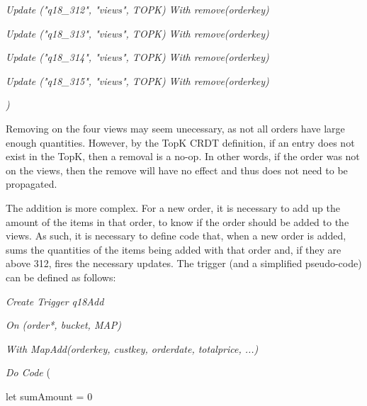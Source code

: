 \documentclass{vldb}
\newcommand{\grumbler}[2]{{\color{red}{\bf #1:} #2}}
\renewcommand{\grumbler}[2]{}
\newcommand{\andre}[1]{\grumbler{andre}{#1}}
\newcommand{\emphvspace}{0.5\baselineskip}
\newcommand{\firstblockemph}[1]{\vspace{\emphvspace}\hspace{2em}\emph{#1}}
\newcommand{\middleblockemph}[1]{\hspace{2em}\emph{#1}}
\newcommand{\lastblockemph}[1]{\hspace{2em}\emph{#1}\vspace{\emphvspace}}
\begin{document}
\middleblockemph{\hspace{-0.5em}	Update ("q18\_312", "views", TOPK) With remove(orderkey)}

\middleblockemph{\hspace{-0.5em}	Update ("q18\_313", "views", TOPK) With remove(orderkey)}

\middleblockemph{\hspace{-0.5em}	Update ("q18\_314", "views", TOPK) With remove(orderkey)}

\middleblockemph{\hspace{-0.5em}	Update ("q18\_315", "views", TOPK) With remove(orderkey)}

\lastblockemph{\hspace{-1.2em})}

Removing on the four views may seem unecessary, as not all orders have large enough quantities.
However, by the TopK CRDT definition, if an entry does not exist in the TopK, then a removal is a no-op.
In other words, if the order was not on the views, then the remove will have no effect and thus does not need to be propagated.

\andre{In relation to what's above, another possible solution would be to add an extra field to orders to know the amount of items ordered and thus know which TopKs to remove from. The current implementation of the clients keeps this information.}

The addition is more complex.
For a new order, it is necessary to add up the amount of the items in that order, to know if the order should be added to the views.
As such, it is necessary to define code that, when a new order is added, sums the quantities of the items being added with that order and, if they are above 312, fires the necessary updates.
The trigger (and a simplified pseudo-code) can be defined as follows:

\firstblockemph{\hspace{-1.5em}Create Trigger q18Add}

\middleblockemph{\hspace{-1.5em}On (order*, bucket, MAP)}

\middleblockemph{\hspace{-1.5em}With MapAdd(orderkey, custkey, orderdate, totalprice, ...)}


\middleblockemph{\hspace{-1.5em}Do Code} (

\hspace{2.5em}let sumAmount = 0
\end{document}
